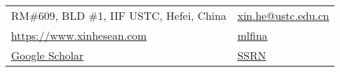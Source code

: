 \documentclass{clean_cv}
\author{Xin He}
\begin{document}
\maketitle
%
%
%	
%	
%	

\begin{center}
	\begin{tabular}{ll}
		 RM\#609, BLD \#1, IIF USTC, Hefei, China 
		&
		 \href{mailto:xin.he@ustc.edu.cn}{ \color{orange} xin.he@ustc.edu.cn} \\
		 \href{https://www.xinhesean.com}{ \color{orange} https://www.xinhesean.com} 
		&
		  \href{https://github.com/mlfina}{ \color{orange} mlfina}   \\   	
		 \href{https://scholar.google.com/citations?user=qD8bY00AAAAJ&hl=en&authuser=2}{ \color{orange}Google Scholar }
		&
		 \href{https://papers.ssrn.com/sol3/cf_dev/AbsByAuth.cfm?per_id=3071233}{ \color{orange} SSRN }          \\
		
	\end{tabular}
\end{center}
\end{document}
